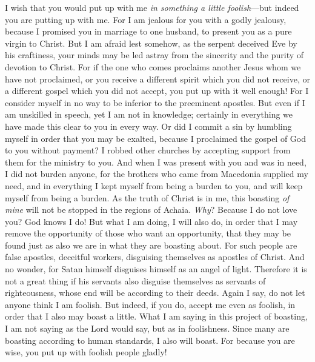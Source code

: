 \begin{biblechapter} %
 I wish that you would put up with me \textit{in something a little foolish}—but indeed you are putting up with me.
\verse For I am jealous for you with a godly jealousy, because I promised you in marriage to one husband, to present you as a pure virgin to Christ.
\verse But I am afraid lest somehow, as the serpent deceived Eve by his craftiness, your minds may be led astray from the sincerity and the purity of devotion to Christ.
\verse For if the one who comes proclaims another Jesus whom we have not proclaimed, or you receive a different spirit which you did not receive, or a different gospel which you did not accept, you put up with it well enough!
\verse For I consider myself in no way to be inferior to the preeminent apostles.
\verse But even if I am unskilled in speech, yet I am not in knowledge; certainly in everything we have made this clear to you in every way.
\verse Or did I commit a sin by humbling myself in order that you may be exalted, because I proclaimed the gospel of God to you without payment?
\verse I robbed other churches by accepting support from them for the ministry to you.
\verse And when I was present with you and was in need, I did not burden anyone, for the brothers who came from Macedonia supplied my need, and in everything I kept myself from being a burden to you, and will keep myself from being a burden.
\verse As the truth of Christ is in me, this boasting \textit{of mine} will not be stopped in the regions of Achaia.
\verse \textit{Why}? Because I do not love you? God knows I do!
\verse But what I am doing, I will also do, in order that I may remove the opportunity of those who want an opportunity, that they may be found just as also we are in what they are boasting about.
\verse For such people are false apostles, deceitful workers, disguising themselves as apostles of Christ.
\verse And no wonder, for Satan himself disguises himself as an angel of light.
\verse Therefore it is not a great thing if his servants also disguise themselves as servants of righteousness, whose end will be according to their deeds.
 Again I say, do not let anyone think I am foolish. But indeed, if you do, accept me even as foolish, in order that I also may boast a little.
\verse What I am saying in this project of boasting, I am not saying as the Lord would say, but as in foolishness.
\verse Since many are boasting according to human standards, I also will boast.
\verse For because you are wise, you put up with foolish people gladly!

\end{biblechapter}
